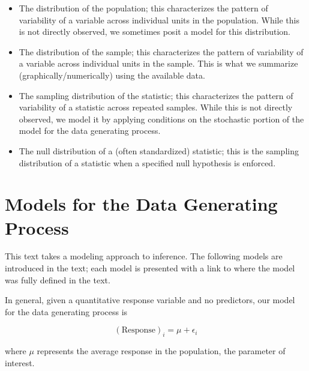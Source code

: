 \documentclass[
  letterpaper,
  DIV=11,
  numbers=noendperiod]{scrreprt}
\providecommand{\tightlist}{%
  \setlength{\itemsep}{0pt}\setlength{\parskip}{0pt}}\usepackage{longtable,booktabs,array}
\theoremstyle{definition}
\theoremstyle{definition}
\theoremstyle{plain}
\theoremstyle{remark}
\begin{document}
\begin{itemize}
\tightlist
\item
  The distribution of the population; this characterizes the pattern of
  variability of a variable across individual units in the population.
  While this is not directly observed, we sometimes posit a model for
  this distribution.
\item
  The distribution of the sample; this characterizes the pattern of
  variability of a variable across individual units in the sample. This
  is what we summarize (graphically/numerically) using the available
  data.
\item
  The sampling distribution of the statistic; this characterizes the
  pattern of variability of a statistic across repeated samples. While
  this is not directly observed, we model it by applying conditions on
  the stochastic portion of the model for the data generating process.
\item
  The null distribution of a (often standardized) statistic; this is the
  sampling distribution of a statistic when a specified null hypothesis
  is enforced.
\end{itemize}

\section{Models for the Data Generating
Process}\label{models-for-the-data-generating-process}

This text takes a modeling approach to inference. The following models
are introduced in the text; each model is presented with a link to where
the model was fully defined in the text.

\begin{tcolorbox}[enhanced jigsaw, colbacktitle=quarto-callout-important-color!10!white, colback=white, left=2mm, title=\textcolor{quarto-callout-important-color}{\faExclamation}\hspace{0.5em}{Data Generating Process for Single Mean Response
(Equation~\ref{eq-single-mean})}, toptitle=1mm, leftrule=.75mm, breakable, bottomrule=.15mm, arc=.35mm, rightrule=.15mm, toprule=.15mm, coltitle=black, opacityback=0, colframe=quarto-callout-important-color-frame, opacitybacktitle=0.6, bottomtitle=1mm, titlerule=0mm]

In general, given a quantitative response variable and no predictors,
our model for the data generating process is

\[(\text{Response})_i = \mu + \epsilon_i\]

where \(\mu\) represents the average response in the population, the
parameter of interest.

\end{tcolorbox}
\end{document}
